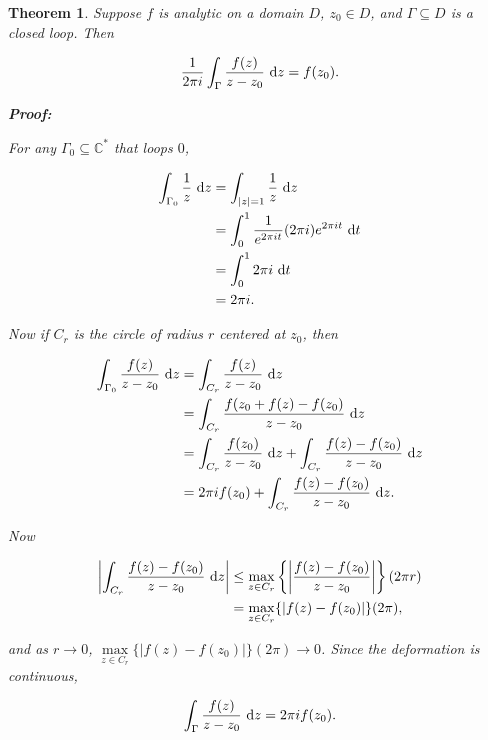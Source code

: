 \documentclass{article}
\theoremstyle{colontheorem}
\newtheorem{theorem}{Theorem}[section]
\newenvironment{Theorem}
{
	\begin{mdframed}[backgroundcolor=TheoremOrange!10]
	\begin{theorem}
}
{
	\end{theorem}
	\end{mdframed}
	
	\vspace{.15in}
}
\newenvironment{Proof}
{
	\begin{mdframed}[backgroundcolor=ProofPurple!10]
	\textbf{Proof:}%
}
{
	\end{mdframed}
	
	\vspace{.085in}
}
\begin{document}
\begin{Theorem}
	
	Suppose $f$ is analytic on a domain $D$, $z_0 \in D$, and $\Gamma \subseteq D$ is a closed loop. Then
	
	$$
		\frac{1}{2 \pi i} \int_\Gamma \frac{f(z)}{z - z_0}\ \textnormal{d}z = f(z_0).
	$$
	
	\begin{Proof}
		For any $\Gamma_0 \subseteq \mathbb{C}^*$ that loops $0$, 
		
		\begin{align*}
			\int_{\Gamma_0} \frac{1}{z}\ \textnormal{d}z &= \int_{|z| = 1} \frac{1}{z}\ \textnormal{d}z\\
			&= \int_0^1 \frac{1}{e^{2 \pi i t}} (2 \pi i) e^{2 \pi i t}\ \textnormal{d}t\\
			&= \int_0^1 2 \pi i\ \textnormal{d}t\\
			&= 2 \pi i.
		\end{align*}
		
		Now if $C_r$ is the circle of radius $r$ centered at $z_0$, then
		
		\begin{align*}
			\int_{\Gamma_0} \frac{f(z)}{z - z_0}\ \textnormal{d}z &= \int_{C_r} \frac{f(z)}{z - z_0}\ \textnormal{d}z\\
			&= \int_{C_r} \frac{f(z_0 + f(z) - f(z_0)}{z - z_0}\ \textnormal{d}z\\
			&= \int_{C_r} \frac{f(z_0)}{z - z_0}\ \textnormal{d}z + \int_{C_r} \frac{f(z) - f(z_0)}{z - z_0}\ \textnormal{d}z\\
			&= 2 \pi i f(z_0) + \int_{C_r} \frac{f(z) - f(z_0)}{z - z_0}\ \textnormal{d}z.
		\end{align*}
		
		Now
		
		\begin{align*}
			\left| \int_{C_r} \frac{f(z) - f(z_0)}{z - z_0}\ \textnormal{d}z \right| &\leq \max\limits_{z \in C_r} \left\{ \left| \frac{f(z) - f(z_0)}{z - z_0} \right| \right\} (2 \pi r)\\
			&= \max\limits_{z \in C_r} \{ |f(z) - f(z_0)| \} (2 \pi)\textnormal{,}
		\end{align*}
		
		and as $r \to 0$, $\max\limits_{z \in C_r} \{ |f(z) - f(z_0)| \} (2 \pi) \to 0$. Since the deformation is continuous,
		
		$$
			\int_\Gamma \frac{f(z)}{z - z_0}\ \textnormal{d}z = 2 \pi i f(z_0).
		$$
		
	\end{Proof}
	
\end{Theorem}
\end{document}
